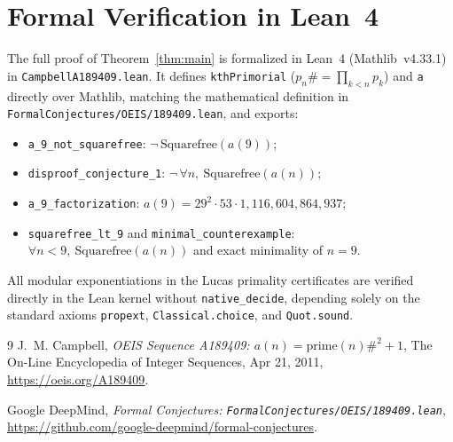 \documentclass[11pt]{article}
\begin{document}
\section{Formal Verification in Lean~4}
The full proof of Theorem~\ref{thm:main} is formalized in Lean~4 (Mathlib~v4.33.1) in \texttt{CampbellA189409.lean}. It defines \texttt{kthPrimorial} ($p_n\# = \prod_{k < n} p_k$) and \texttt{a} directly over Mathlib, matching the mathematical definition in \texttt{FormalConjectures/OEIS/189409.lean}, and exports:
\begin{itemize}
\item \texttt{a\_9\_not\_squarefree}: $\neg\,\mathrm{Squarefree}(a(9))$;
\item \texttt{disproof\_conjecture\_1}: $\neg\,\forall n,\ \mathrm{Squarefree}(a(n))$;
\item \texttt{a\_9\_factorization}: $a(9) = 29^2 \cdot 53 \cdot 1{,}116{,}604{,}864{,}937$;
\item \texttt{squarefree\_lt\_9} and \texttt{minimal\_counterexample}: $\forall n < 9,\ \mathrm{Squarefree}(a(n))$ and exact minimality of $n = 9$.
\end{itemize}
All modular exponentiations in the Lucas primality certificates are verified directly in the Lean kernel without \texttt{native\_decide}, depending solely on the standard axioms \texttt{propext}, \texttt{Classical.choice}, and \texttt{Quot.sound}.

\begin{thebibliography}{9}
J.~M. Campbell, \emph{OEIS Sequence A189409: $a(n) = \mathrm{prime}(n)\#^2 + 1$}, The On-Line Encyclopedia of Integer Sequences, Apr 21, 2011, \url{https://oeis.org/A189409}.

Google DeepMind, \emph{Formal Conjectures: \texttt{FormalConjectures/OEIS/189409.lean}}, \url{https://github.com/google-deepmind/formal-conjectures}.
\end{thebibliography}
\end{document}
